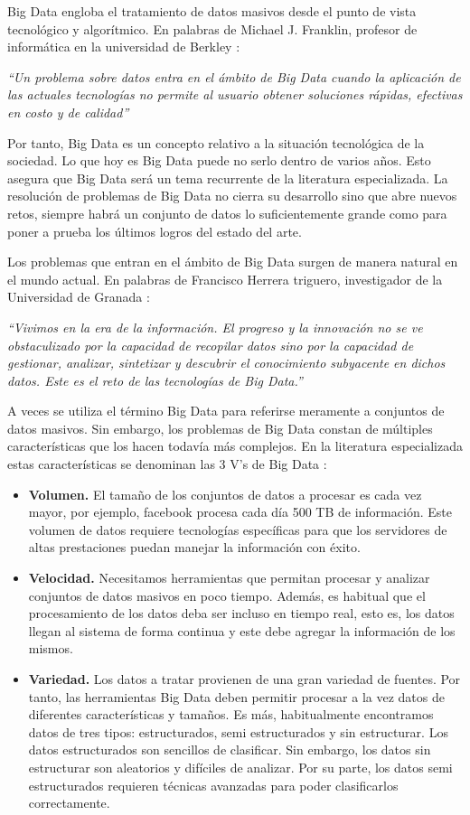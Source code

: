 \documentclass[10pt]{article}
\begin{document}
	Big Data engloba el tratamiento de datos masivos desde el punto de vista tecnológico y algorítmico. En palabras de Michael J. Franklin, profesor de informática en la universidad de Berkley \cite{bd-definition}:
	
	\textit{``Un problema sobre datos entra en el ámbito de Big Data cuando la aplicación de las actuales tecnologías no permite al usuario obtener soluciones  rápidas, efectivas en costo y de calidad''}

	Por tanto, Big Data es un concepto relativo a la situación tecnológica de la sociedad. Lo que hoy es Big Data puede no serlo dentro de varios años. Esto asegura que Big Data será un tema recurrente de la literatura especializada. La resolución de problemas de Big Data no cierra su desarrollo sino que abre nuevos retos, siempre habrá un conjunto de datos lo suficientemente grande como para poner a prueba los últimos logros del estado del arte.

	Los problemas que entran en el ámbito de Big Data surgen de manera natural en el mundo actual. En palabras de Francisco Herrera triguero, investigador de la Universidad de Granada  \cite{big-data-herrera}:
	
	\textit{``Vivimos en la era de la información. El progreso y la innovación no se ve obstaculizado por la capacidad de recopilar datos sino por la capacidad de gestionar, analizar, sintetizar y descubrir el conocimiento subyacente en dichos datos. Este es el reto de las tecnologías de Big Data.''}
	
	A veces se utiliza el término Big Data para referirse meramente a conjuntos de datos masivos. Sin embargo, los problemas de Big Data constan de múltiples características que los hacen todavía más complejos. En la literatura especializada estas características se denominan las 3 V's de Big Data \cite{big-data}:

	\begin{itemize}
		\item \textbf{Volumen.} El tamaño de los conjuntos de datos a procesar es cada vez mayor, por ejemplo, facebook procesa cada día 500 TB de información. Este volumen de datos requiere tecnologías específicas para que los servidores de altas prestaciones puedan manejar la información con éxito.
		\item \textbf{Velocidad.} Necesitamos herramientas que permitan procesar y analizar conjuntos de datos masivos en poco tiempo. Además, es habitual que el procesamiento de los datos deba ser incluso en tiempo real, esto es, los datos llegan al sistema de forma continua y este debe agregar la información de los mismos.
		\item \textbf{Variedad.} Los datos a tratar provienen de una gran variedad de fuentes. Por tanto, las herramientas Big Data deben permitir procesar a la vez datos de diferentes características y tamaños. Es más, habitualmente encontramos datos de tres tipos: estructurados, semi estructurados y sin estructurar. Los datos estructurados son sencillos de clasificar. Sin embargo, los datos sin estructurar son aleatorios y difíciles de analizar. Por su parte, los datos semi estructurados requieren técnicas avanzadas para poder clasificarlos correctamente.
	\end{itemize}
\end{document}
